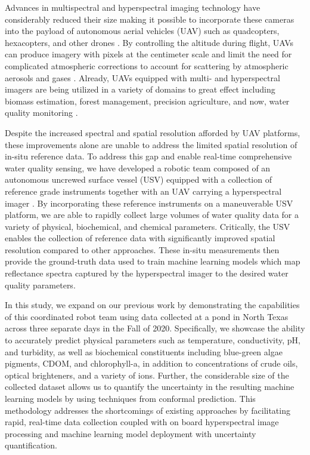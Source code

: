 \documentclass[sensors,article,submit,pdftex,moreauthors]{Definitions/mdpi}
\begin{document}
Advances in multispectral and hyperspectral imaging technology have considerably reduced their size making it possible to incorporate these cameras into the payload of autonomous aerial vehicles (UAV) such as quadcopters, hexacopters, and other drones \cite{hruska2012radiometric}. By controlling the altitude during flight, UAVs can produce imagery with pixels at the centimeter scale and limit the need for complicated atmospheric corrections to account for scattering by atmospheric aerosols and gases \cite{adao2017hyperspectral,banerjee2020uav}. Already, UAVs equipped with multi- and hyperspectral imagers are being utilized in a variety of domains to great effect including biomass estimation, forest management, precision agriculture, and now, water quality monitoring \cite{adao2017hyperspectral, padua2017uas,arroyo2019implementation,kurihara2020unmanned,ehmann2019monitoring, lu2021retrieval}.  

Despite the increased spectral and spatial resolution afforded by UAV platforms, these improvements alone are unable to address the limited spatial resolution of in-situ reference data.  To address this gap and enable real-time comprehensive water quality sensing, we have developed a robotic team composed of an autonomous uncrewed surface vessel (USV) equipped with a collection of reference grade instruments together with an UAV carrying a hyperspectral imager \cite{robotTeam1}. By incorporating these reference instruments on a maneuverable USV platform, we are able to rapidly collect large volumes of water quality data for a variety of physical, biochemical, and chemical parameters. Critically, the USV enables the collection of reference data with significantly improved spatial resolution compared to other approaches. These in-situ measurements then provide the ground-truth data used to train machine learning models which map reflectance spectra captured by the hyperspectral imager to the desired water quality parameters.

In this study, we expand on our previous work by demonstrating the capabilities of this coordinated robot team using data collected at a pond in North Texas across three separate days in the Fall of 2020. Specifically, we showcase the ability to accurately predict physical parameters such as temperature, conductivity, pH, and turbidity, as well as biochemical constituents including blue-green algae pigments, CDOM, and chlorophyll-a, in addition to concentrations of crude oils, optical brighteners, and a variety of ions. Further, the considerable size of the collected dataset allows us to quantify the uncertainty in the resulting machine learning models by using techniques from conformal prediction. This methodology addresses the shortcomings of existing approaches by facilitating rapid, real-time data collection coupled with on board hyperspectral image processing and machine learning model deployment with uncertainty quantification.
\end{document}
